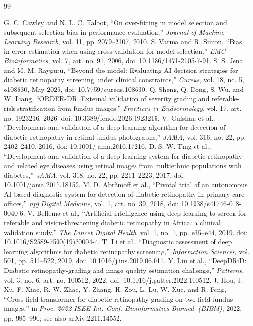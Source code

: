 \documentclass[11pt]{article}
\begin{document}
\begin{thebibliography}{99}

 G. C. Cawley and N. L. C. Talbot, ``On over-fitting in model selection and subsequent selection bias in performance evaluation,'' \emph{Journal of Machine Learning Research}, vol. 11, pp. 2079--2107, 2010.
 S. Varma and R. Simon, ``Bias in error estimation when using cross-validation for model selection,'' \emph{BMC Bioinformatics}, vol. 7, art. no. 91, 2006, doi: 10.1186/1471-2105-7-91.
 S. S. Jena and M. M. Rayguru, ``Beyond the model: Evaluating AI decision strategies for diabetic retinopathy screening under clinical constraints,'' \emph{Cureus}, vol. 18, no. 5, e108630, May 2026, doi: 10.7759/cureus.108630.
 Q. Sheng, Q. Dong, S. Wu, and W. Liang, ``ORDER-DR: External validation of severity grading and referable-risk stratification from fundus images,'' \emph{Frontiers in Endocrinology}, vol. 17, art. no. 1923216, 2026, doi: 10.3389/fendo.2026.1923216.
 V. Gulshan et al., ``Development and validation of a deep learning algorithm for detection of diabetic retinopathy in retinal fundus photographs,'' \emph{JAMA}, vol. 316, no. 22, pp. 2402--2410, 2016, doi: 10.1001/jama.2016.17216.
 D. S. W. Ting et al., ``Development and validation of a deep learning system for diabetic retinopathy and related eye diseases using retinal images from multiethnic populations with diabetes,'' \emph{JAMA}, vol. 318, no. 22, pp. 2211--2223, 2017, doi: 10.1001/jama.2017.18152.
 M. D. Abr\`amoff et al., ``Pivotal trial of an autonomous AI-based diagnostic system for detection of diabetic retinopathy in primary care offices,'' \emph{npj Digital Medicine}, vol. 1, art. no. 39, 2018, doi: 10.1038/s41746-018-0040-6.
 V. Bellemo et al., ``Artificial intelligence using deep learning to screen for referable and vision-threatening diabetic retinopathy in Africa: a clinical validation study,'' \emph{The Lancet Digital Health}, vol. 1, no. 1, pp. e35--e44, 2019, doi: 10.1016/S2589-7500(19)30004-4.
 T. Li et al., ``Diagnostic assessment of deep learning algorithms for diabetic retinopathy screening,'' \emph{Information Sciences}, vol. 501, pp. 511--522, 2019, doi: 10.1016/j.ins.2019.06.011.
 Y. Liu et al., ``DeepDRiD: Diabetic retinopathy-grading and image quality estimation challenge,'' \emph{Patterns}, vol. 3, no. 6, art. no. 100512, 2022, doi: 10.1016/j.patter.2022.100512.
 J. Hou, J. Xu, F. Xiao, R.-W. Zhao, Y. Zhang, H. Zou, L. Lu, W. Xue, and R. Feng, ``Cross-field transformer for diabetic retinopathy grading on two-field fundus images,'' in \emph{Proc. 2022 IEEE Int. Conf. Bioinformatics Biomed. (BIBM)}, 2022, pp. 985--990; see also arXiv:2211.14552.

\end{thebibliography}
\end{document}
